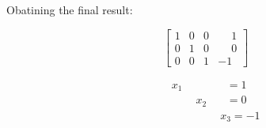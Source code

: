 \documentclass{article}
\begin{document}
Obatining the final result:

\begin{equation}
    \begin{bmatrix}
        1 & 0 & 0 & \phantom{-}1\\
        0 & 1 & 0 & \phantom{-}0\\
        0 & 0 & 1 & -1
    \end{bmatrix}
\end{equation}

\begin{align*}
    \quad & x_1 \phantom{+x_2+x_3} = 1\\
    \quad & \phantom{x_1+} x_2 \phantom{+x_3} = 0\\
    \quad & \phantom{x_1+x_2+} x_3 = -1\\
\end{align*}
\end{document}
